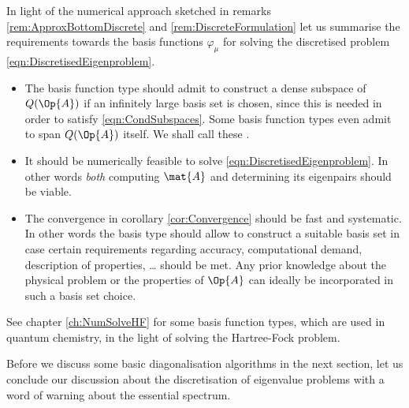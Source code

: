 \begin{rem}
	\label{rem:ChoiceBasisFunction}
In light of the numerical approach sketched in
remarks \ref{rem:ApproxBottomDiscrete} and \ref{rem:DiscreteFormulation}
let us summarise the requirements towards the basis functions $\varphi_\mu$
for solving the discretised problem \eqref{eqn:DiscretisedEigenproblem}.
\begin{itemize}
	\item The basis function type should admit
		to construct a dense subspace of $Q(\Op{A})$
		if an infinitely large basis set is chosen,
		since this is needed in order to satisfy \eqref{eqn:CondSubspaces}.
		Some basis function types even admit to span $Q(\Op{A})$ itself.
		We shall call these .
	\item It should be numerically feasible to solve \eqref{eqn:DiscretisedEigenproblem}.
		In other words \emph{both} computing $\mat{A}$
		and determining its eigenpairs
		should be viable.
	\item The convergence in corollary \ref{cor:Convergence}
		should be fast and systematic.
		In other words the basis type should
		allow to construct a suitable basis set
		in case certain requirements
		regarding accuracy, computational demand,  description of properties, \ldots
		should be met.
		Any prior knowledge about the physical problem
		or the properties of $\Op{A}$ can ideally be incorporated
		in such a basis set choice.
\end{itemize}
See chapter \vref{ch:NumSolveHF} for some basis function types,
which are used in quantum chemistry,
in the light of solving the Hartree-Fock problem.
\end{rem}

Before we discuss some basic diagonalisation
algorithms in the next section,
let us conclude our discussion about the discretisation
of eigenvalue problems
with a word of warning about the essential spectrum.

